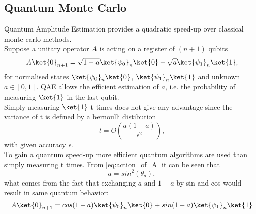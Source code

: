 \documentclass[../../main.tex]{subfiles}
\begin{document}
\subsection{Quantum Monte Carlo}\label{sec: qmc}
Quantum Amplitude Estimation provides a quadratic speed-up over classical monte carlo methods. \\
Suppose a unitary operator $A$ is acting on a register of $(n+1)$ qubits
\begin{equation}\label{eq:action_of_A}
  A\ket{0}_{n+1} = \sqrt{1-a}\ket{\psi_0}_{n}\ket{0}+\sqrt{a}\ket{\psi_1}_{n}\ket{1},
\end{equation}
for normalised states $\ket{\psi_0}_{n}\ket{0}$, $\ket{\psi_1}_{n}\ket{1}$ and unknown $a \in [0,1]$.
QAE allows the efficient estimation of $a$, i.e. the probability of measuring $\ket{1}$ in the last qubit.\\
Simply measuring $\ket{1}$ t times does not give any advantage since the variance of t is defined by a bernoulli distibution
\begin{equation}\label{eq:t}
  t = O(\frac{a(1-a)}{\epsilon^2}),
\end{equation}
with given accuracy $\epsilon$.\\
To gain a quantum speed-up more efficient quantum algorithms are used than simply measuring t times. 
From \ref{eq:action_of_A} it can be seen that
\begin{equation}\label{eq:aIsSin}
  a = sin^2(\theta_a),
\end{equation}
what comes from the fact that exchanging $a \text{ and } 1-a$ by sin and cos would result in same quantum behavior:\\
\begin{equation}\label{eq:action_of_A_sin}
  A\ket{0}_{n+1} = cos(1-a)\ket{\psi_0}_{n}\ket{0}+sin(1-a)\ket{\psi_1}_{n}\ket{1}
\end{equation}
\end{document}
